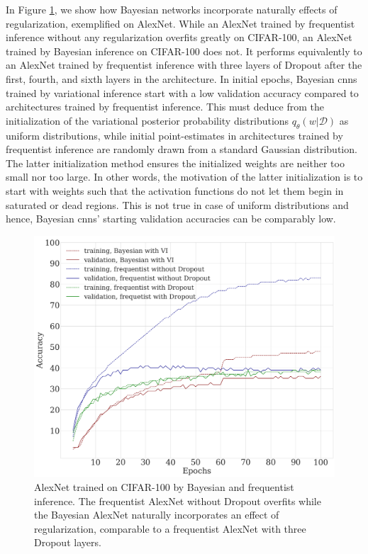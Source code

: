 \newline In Figure \ref{fig:regularisation}, we show how Bayesian networks incorporate naturally effects of regularization, exemplified on AlexNet. While an AlexNet trained by frequentist inference without any regularization overfits greatly on CIFAR-100, an AlexNet trained by Bayesian inference on CIFAR-100 does not. It performs equivalently to an AlexNet trained by frequentist inference with three layers of Dropout after the first, fourth, and sixth layers in the architecture. In initial epochs, Bayesian \acp{cnn} trained by variational inference start with a low validation accuracy compared to architectures trained by frequentist inference. This must deduce from the initialization of the variational posterior probability distributions $q_{\theta}(w|\mathcal{D})$ as uniform distributions, while initial point-estimates in architectures trained by frequentist inference are randomly drawn from a standard Gaussian distribution. The latter initialization method ensures the initialized weights are neither too small nor too large. In other words, the motivation of the latter initialization is to start with weights such that the activation functions do not let them begin in saturated or dead regions. This is not true in case of uniform distributions and hence, Bayesian \acp{cnn}' starting validation accuracies can be comparably low.
%
\begin{figure}[t!] 
\centering
\includegraphics[width=\linewidth]{Chapter5/Figs/results_regularization.png}
\caption{AlexNet trained on CIFAR-100 by Bayesian and frequentist inference. The frequentist AlexNet without Dropout overfits while the Bayesian AlexNet naturally incorporates an effect of regularization, comparable to a frequentist AlexNet with three Dropout layers.}
\label{fig:regularisation}
\end{figure}
